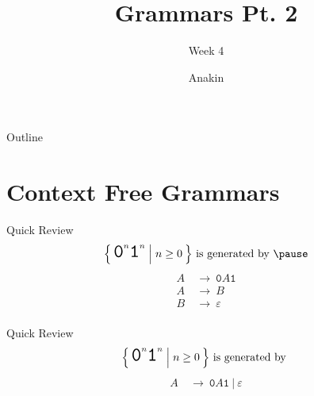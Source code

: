 \documentclass[aspectratio=169]{beamer}
\title{Grammars Pt. 2}
\subtitle{Week 4}
\author{Anakin}
\date{}
\begin{document}

\begin{frame}
\titlepage
\end{frame}

\begin{frame}{Outline}
  \tableofcontents
\end{frame}


\section{Context Free Grammars}
\frame{\sectionpage}

\begin{frame}{Quick Review}
    $$
        {\LARGE \Set{\texttt{0}^n \texttt{1}^n | n \geq 0}} \text{ is generated by }\pause
    $$
    {
    \LARGE
    \vspace{10pt}
    \begin{align*}
        A ~&\to~ \texttt{0}A\texttt{1} \\
        A ~&\to~ B                     \\
        B ~&\to~ \varepsilon           \\
    \end{align*}
    }
\end{frame}

\begin{frame}{Quick Review}
    $$
        {\LARGE \Set{\texttt{0}^n \texttt{1}^n | n \geq 0}} \text{ is generated by }
    $$
    {
    \LARGE
    \vspace{10pt}
    \begin{align*}
        A ~&\to~ \texttt{0}A\texttt{1} ~|~ \varepsilon \\
    \end{align*}
    }
\end{frame}
\end{document}
